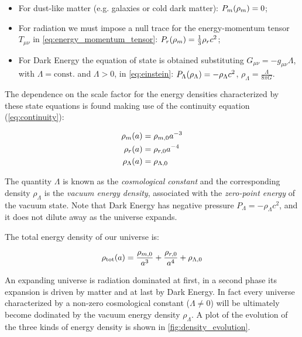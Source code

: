 \begin{itemize}
        \item For dust-like matter (e.g. galaxies or cold dark matter):
        $P_m\qty(\rho_m) = 0$;
        \item For radiation we must impose a null trace for the energy-momentum
        tensor $T_{\mu \nu}$ in \autoref{eq:energy_momentum_tensor}: $P_r\qty(\rho_m)
        = \frac{1}{3} \rho_r c^2$;
        \item For Dark Energy the equation of state is obtained
        substituting  $G_{\mu \nu} = -g_{\mu \nu} \Lambda$, with $\Lambda =
        \text{const.}$ and $\Lambda > 0$, in \autoref{eq:einstein}:
        $P_\Lambda\qty(\rho_\Lambda) = -\rho_\Lambda c^2$, $\rho_\Lambda =
        \frac{\Lambda}{8\pi G}$.
\end{itemize}

The dependence on the scale factor for the energy densities characterized by
these state equations is found making use of the continuity equation 
(\autoref{eq:continuity}):

\begin{align}
        \rho_m\qty(a) & = \rho_{m,0}a^{-3} \label{eq:rho_m} \\
        \rho_r\qty(a) & = \rho_{r,0}a^{-4} \label{eq:rho_r} \\
        \rho_\Lambda\qty(a) & = \rho_{\Lambda,0} \label{eq:rho_lambda} \\
\end{align}

The quantity $\Lambda$ is known as the \emph{cosmological constant} and the
corresponding density $\rho_\Lambda$ is the \emph{vacuum energy density},
associated with the \emph{zero-point energy} of the vacuum state. Note that
Dark Energy has negative pressure $P_\Lambda = -\rho_\Lambda c^2$, and it
does not dilute away as the universe expands.

The total energy density of our universe is:

\begin{equation}
        \rho_\text{tot}\qty(a) = \frac{\rho_{m,0}}{a^3} + \frac{\rho_{r,0}}{a^4} +
        \rho_{\Lambda,0} 
\end{equation}

An expanding universe is radiation dominated at first, in a second phase 
its expansion is driven by matter and at last by Dark Energy. In fact every
universe characterized by a non-zero cosmological constant ($\Lambda \neq
0$) will be ultimately become dodinated by the vacuum energy density
$\rho_\Lambda$. A plot of the evolution of the three kinds of energy
density is shown in \autoref{fig:density_evolution}.

